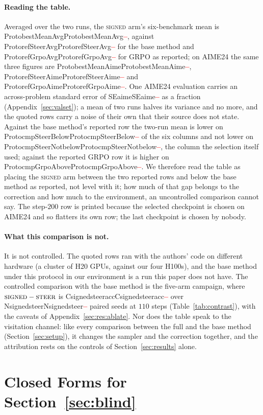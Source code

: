 \documentclass[11pt]{article}
\providecommand{\PENDING}{\textcolor{red}{\textbf{--}}}
\newcommand{\num}[1]{\ifcsname #1\endcsname\csname #1\endcsname\else\PENDING\fi}
\begin{document}
\paragraph{Reading the table.} Averaged over the two runs, the \textsc{signed} arm's six-benchmark
mean is \num{ProtobestMeanAvg}, against \num{ProtorefSteerAvg} for the base method and
\num{ProtorefGrpoAvg} for GRPO as reported; on AIME24 the same three figures are
\num{ProtobestMeanAime}, \num{ProtorefSteerAime} and \num{ProtorefGrpoAime}. One
AIME24 evaluation carries an across-problem standard error of \num{SEaime} as a
fraction (Appendix~\ref{sec:valset}); a mean of two runs halves its variance and no
more, and the quoted rows carry a noise of their own that their source does not
state. Against the base method's reported row the two-run mean is lower on
\num{ProtocmpSteerBelow} of the six columns and not lower on
\num{ProtocmpSteerNotbelow}, the column the selection itself used; against the
reported GRPO row it is higher on \num{ProtocmpGrpoAbove}. We therefore read the
table as placing the \textsc{signed} arm between the two reported rows and below the base method
as reported, not level with it; how much of that gap belongs to the correction and how
much to the environment, an uncontrolled comparison cannot say. The step-$200$ row is
printed because the selected checkpoint is chosen on AIME24 and so flatters its own
row; the last checkpoint is chosen by nobody.

\paragraph{What this comparison is not.} It is not controlled. The quoted rows ran
with the authors' code on different hardware (a cluster of H20 GPUs, against our four
H100s), and the base method under this protocol in our environment is a run this
paper does not have. The controlled comparison with the base method is the five-arm
campaign, where $\textsc{signed} - \textsc{steer}$ is \num{Csignedsteeracc} over
\num{Nsignedsteer} paired seeds at $110$ steps (Table~\ref{tab:contrast}), with the
caveats of Appendix~\ref{sec:res:ablate}. Nor does the table speak to the visitation
channel: like every comparison between the full and the base method
(Section~\ref{sec:setup}), it changes the sampler and the correction together, and
the attribution rests on the controls of Section~\ref{sec:results} alone.



\section{Closed Forms for Section~\ref{sec:blind}}
\label{sec:appendix-closed}
\end{document}
